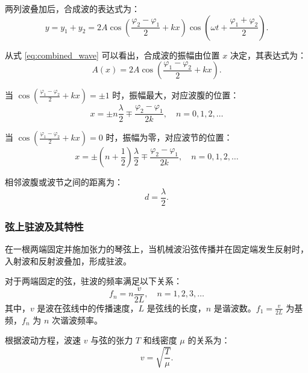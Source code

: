 \documentclass[zihao=5, UTF8]{article}
\theoremstyle{MyLineTheoremStyle} %
\theoremstyle{MyBlockTheoremStyle} %
\theoremstyle{MySubsubsectionStyle} %
\begin{document}
两列波叠加后，合成波的表达式为：
\begin{equation}
    y = y_1 + y_2 = 2A \cos\left(\frac{\varphi_2 - \varphi_1}{2} + kx\right) \cos\left(\omega t + \frac{\varphi_1 + \varphi_2}{2}\right). \label{eq:combined_wave}
\end{equation}

从式 \eqref{eq:combined_wave} 可以看出，合成波的振幅由位置 $x$ 决定，其表达式为：
\begin{equation}
    A(x) = 2A \cos\left(\frac{\varphi_1 - \varphi_2}{2} + kx\right). \label{eq:amplitude}
\end{equation}

当 $\cos\left(\frac{\varphi_1 - \varphi_2}{2} + kx\right) = \pm 1$ 时，振幅最大，对应波腹的位置：
\begin{equation}
  x = \pm n\frac{\lambda}{2} \mp \frac{\varphi_2 - \varphi_1}{2k}, \quad n = 0, 1, 2, \ldots \label{eq:antinode}
\end{equation}

当 $\cos\left(\frac{\varphi_1 - \varphi_2}{2} + kx\right) = 0$ 时，振幅为零，对应波节的位置：
\begin{equation}
    x = \pm \left(n + \frac{1}{2}\right)\frac{\lambda}{2} \mp \frac{\varphi_2 - \varphi_1}{2k}, \quad n = 0, 1, 2, \ldots \label{eq:node}
\end{equation}

相邻波腹或波节之间的距离为：
\begin{equation}
    d = \frac{\lambda}{2}.
\end{equation}

\subsubsection{弦上驻波及其特性}

在一根两端固定并施加张力的琴弦上，当机械波沿弦传播并在固定端发生反射时，入射波和反射波叠加，形成驻波。

对于两端固定的弦，驻波的频率满足以下关系：
\begin{equation}
    f_n = n\frac{v}{2L}, \quad n = 1, 2, 3, \ldots \label{eq:resonance_freq}
\end{equation}
其中，$v$ 是波在弦线中的传播速度，$L$ 是弦线的长度，$n$ 是谐波数。$f_1 = \frac{v}{2L}$ 为基频，$f_n$ 为 $n$ 次谐波频率。

根据波动方程，波速 $v$ 与弦的张力 $T$ 和线密度 $\mu$ 的关系为：
\begin{equation}
    v = \sqrt{\frac{T}{\mu}}. \label{eq:wave_speed}
\end{equation}
\end{document}
